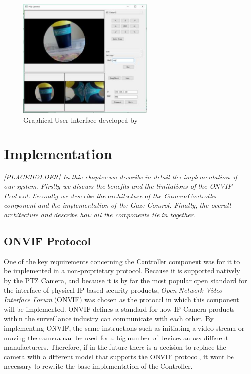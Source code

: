 \documentclass{l4proj}
\begin{document}
\begin{figure}[ht]
    \centering
    \includegraphics[width=0.6\textwidth]{l4template-master/images/old_gui_temp.png}
    \caption{Graphical User Interface developed by \cite{JianwenZhou}}
    \label{oldgui}
\end{figure}


\chapter{Implementation}

\textit{[PLACEHOLDER] In this chapter we describe in detail the implementation of our system. Firstly we discuss the benefits and the limitations of the ONVIF Protocol. Secondly we describe the architecture of the CameraController component and the implementation of the Gaze Control. Finally, the overall architecture and describe how all the components tie in together.}

\section{ONVIF Protocol}

One of the key requirements concerning the Controller component was for it to be implemented in a non-proprietary protocol. Because it is supported natively by the PTZ Camera, and because it is by far the most popular open standard for the interface of physical IP-based security products, \textit{Open Network Video Interface Forum} (ONVIF) was chosen as the protocol in which this component will be implemented. ONVIF defines a standard for how IP Camera products within the surveillance industry can communicate with each other. By implementing ONVIF, the same instructions such as initiating a video stream or moving the camera can be used for a big number of devices across different manufacturers. Therefore, if in the future there is a decision to replace the camera with a different model that supports the ONVIF protocol, it wont be necessary to rewrite the base implementation of the Controller. 
\end{document}
